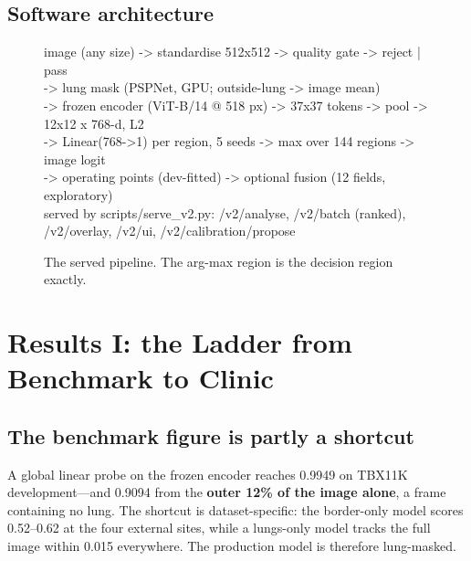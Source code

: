 \documentclass[12pt,a4paper]{report}
\begin{document}
\section{Software architecture}
\begin{figure}[h]\centering
\begin{minipage}{0.95\textwidth}\small\ttfamily
image (any size) -> standardise 512x512 -> quality gate -> reject | pass\\
\hspace*{1em}-> lung mask (PSPNet, GPU; outside-lung -> image mean)\\
\hspace*{1em}-> frozen encoder (ViT-B/14 @ 518 px) -> 37x37 tokens -> pool -> 12x12 x 768-d, L2\\
\hspace*{1em}-> Linear(768->1) per region, 5 seeds -> max over 144 regions -> image logit\\
\hspace*{1em}-> operating points (dev-fitted) -> optional fusion (12 fields, exploratory)\\
served by scripts/serve\_v2.py: /v2/analyse, /v2/batch (ranked), /v2/overlay, /v2/ui, /v2/calibration/propose
\end{minipage}
\caption{The served pipeline. The arg-max region is the decision region exactly.}
\end{figure}

\chapter{Results I: the Ladder from Benchmark to Clinic}\label{sec:ladder}
\section{The benchmark figure is partly a shortcut}
A global linear probe on the frozen encoder reaches 0.9949 on TBX11K development---and 0.9094 from the \textbf{outer 12\% of the image alone}, a frame containing no lung. The shortcut is dataset-specific: the border-only model scores 0.52--0.62 at the four external sites, while a lungs-only model tracks the full image within 0.015 everywhere. The production model is therefore lung-masked.
\end{document}
